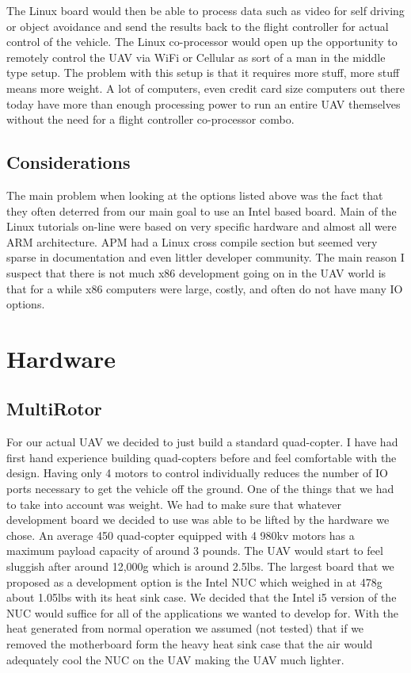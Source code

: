 \documentclass[letterpaper,10pt,notitlepage,fleqn]{article}
\begin{document}
The Linux board would then be able to process data such as video for self driving or object avoidance and send the results back to the flight controller for actual control of the vehicle. The Linux co-processor would open up the opportunity to remotely control the UAV via WiFi or Cellular as sort of a man in the middle type setup. The problem with this setup is that it requires more stuff, more stuff means more weight. A lot of computers, even credit card size computers out there today
have more than enough processing power to run an entire UAV themselves without the need for a flight controller co-processor combo. 

\subsection{Considerations}
\indent The main problem when looking at the options listed above was the fact that they often deterred from our main goal to use an Intel based board. Main of the Linux tutorials on-line were based on very specific hardware and almost all were ARM architecture. APM had a Linux cross compile section but seemed very sparse in documentation and even littler developer community. The main reason I suspect that there is not much x86 development going on in the UAV world is that for a
while x86 computers were large, costly, and often do not have many IO options.
\section{Hardware}

\subsection{MultiRotor}
\indent For our actual UAV we decided to just build a standard quad-copter. I have had first hand experience building quad-copters before and feel comfortable with the design. Having only 4 motors to control individually reduces the number of IO ports necessary to get the vehicle off the ground. One of the things that we had to take into account was weight. We had to make sure that whatever development board we decided to use was able to be lifted by the hardware we chose.
An average 450 quad-copter equipped with 4 980kv motors has a maximum payload capacity of around 3 pounds. The UAV would start to feel sluggish after around 12,000g which is around 2.5lbs. The largest board that we proposed as a development option is the Intel NUC which weighed in at 478g about 1.05lbs with its heat sink case. We decided that the Intel i5 version of the NUC would suffice for all of the applications we wanted to develop for. With the heat generated from normal
operation we assumed (not tested) that if we removed the motherboard form the heavy heat sink case that the air would adequately cool the NUC on the UAV making the UAV much lighter. 
\end{document}
